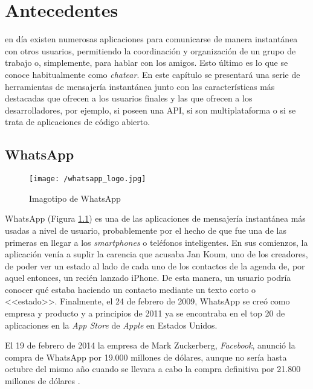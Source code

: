 \chapter{Antecedentes}
\label{chap:antecedentes}

 en día existen numerosas aplicaciones para comunicarse de manera instantánea con otros usuarios, permitiendo la coordinación y organización de un grupo de trabajo o, simplemente, para hablar con los amigos. Esto último es lo que se conoce habitualmente como \textit{chatear}. En este capítulo se presentará una serie de herramientas de mensajería instantánea junto con las características más destacadas que ofrecen a los usuarios finales y las que ofrecen a los desarrolladores, por ejemplo, si poseen una \acf{API}, si son multiplataforma o si se trata de aplicaciones de código abierto.

\section{WhatsApp}
\label{sec:whatsapp}

\begin{figure}
	\begin{center}
		\texttt{[image: /whatsapp\_logo.jpg]}
		\caption{Imagotipo de WhatsApp}
		\label{fig:whatsapp}
	\end{center}
\end{figure}

WhatsApp (Figura \ref{fig:whatsapp}) es una de las aplicaciones de mensajería instantánea más usadas a nivel de usuario, probablemente por el hecho de que fue una de las primeras en llegar a los \textit{smartphones} o teléfonos inteligentes. En sus comienzos, la aplicación venía a suplir la carencia que acusaba Jan Koum, uno de los creadores, de poder ver un estado al lado de cada uno de los contactos de la agenda de, por aquel entonces, un recién lanzado iPhone. De esta manera, un usuario podría conocer qué estaba haciendo un contacto mediante un texto corto o <<estado>>. Finalmente, el 24 de febrero de 2009, WhatsApp se creó como empresa y producto y a principios de 2011 ya se encontraba en el top 20 de aplicaciones en la \textit{App Store} de \textit{Apple} en Estados Unidos.

\newpage

El 19 de febrero de 2014 la empresa de Mark Zuckerberg, \textit{Facebook}, anunció la compra de WhatsApp por 19.000 millones de dólares, aunque no sería hasta octubre del mismo año cuando se llevara a cabo la compra definitiva por 21.800 millones de dólares \cite{Novoa2014}.

